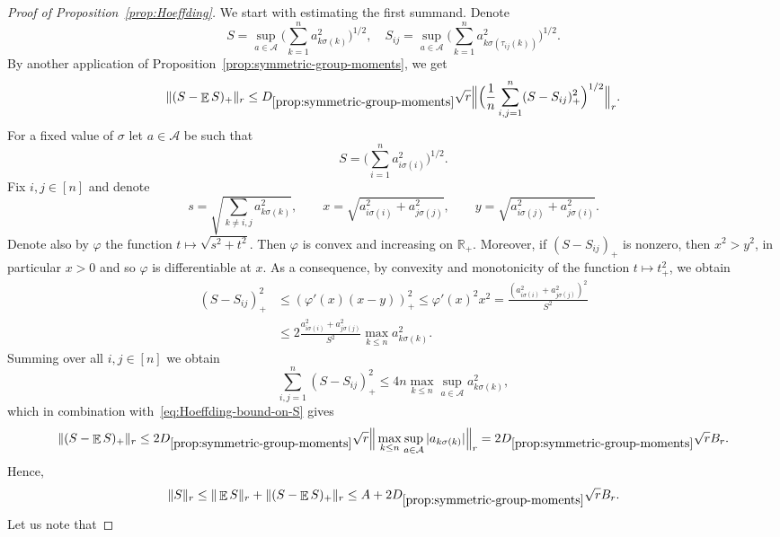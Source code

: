 \documentclass[a4paper]{amsart}
\theoremstyle{definition}
\theoremstyle{remark}
\numberwithin{equation}{section}
\newcommand*{\RR}{\mathbb{R}}
\newcommand*{\ds}{D_{\ref{prop:symmetric-group-moments}}}
\DeclareMathOperator{\EE}{\mathbb{E}} %
\begin{document}
\begin{proof}[Proof of Proposition~\ref{prop:Hoeffding}]
We start with estimating the first summand.
Denote
\[S = \sup_{a\in \mathcal{A}}\Big(\sum_{k=1}^n a_{k\sigma(k)}^2\Big)^{1/2},
\quad
S_{ij} = \sup_{a\in \mathcal{A}}\Big(\sum_{k=1}^n a_{k\sigma(\tau_{ij}(k))}^2\Big)^{1/2}.
\]
 By another application  of Proposition~\ref{prop:symmetric-group-moments}, we get
\begin{align}\label{eq:Hoeffding-bound-on-S}
  \|(S-\EE S)_+\|_r \le \ds\sqrt{r} \Big\|\Big(\frac{1}{n}\sum_{i,j=1}^n (S-S_{ij})_+^2\Big)^{1/2}\Big\|_r.
\end{align}
For a fixed value of $\sigma$ let $a \in \mathcal{A}$ be such that
\begin{displaymath}
  S = \Big(\sum_{i=1}^n a_{i\sigma(i)}^2\Big)^{1/2}.
\end{displaymath}
Fix $i,j \in [n]$ and denote
\begin{displaymath}
s = \sqrt{\sum_{k\neq i,j} a_{k\sigma(k)}^2},
\qquad
x = \sqrt{a_{i\sigma(i)}^2+a_{j\sigma(j)}^2},
\qquad
y = \sqrt{a_{i\sigma(j)}^2+a_{j\sigma(i)}^2}.
\end{displaymath}
 Denote also by $\varphi$ the function $t \mapsto \sqrt{s^2 + t^2}$. Then $\varphi$ is convex and increasing on $\RR_+$. Moreover, if $(S - S_{ij})_+$ is nonzero, then $x^2 > y^2$, in particular $x > 0$ and so $\varphi$ is differentiable at $x$. As a consequence, by convexity and monotonicity of the function $t \mapsto t_+^2$, we obtain
\begin{align*}
  (S-S_{ij})_+^2 & \le (\varphi'(x)(x-y))_+^2 \le \varphi'(x)^2 x^2 = \frac{(a_{i\sigma(i)}^2 + a_{j\sigma(j)}^2)^2}{ S^2} \\
  & \le 2\frac{a_{i\sigma(i)}^2 + a_{j\sigma(j)}^2}{ S^2} \max_{k\le n} a_{k\sigma(k)}^2.
\end{align*}
Summing over all $i,j \in [n]$ we obtain
\begin{displaymath}
  \sum_{i,j=1}^n (S - S_{ij})_+^2 \le 4n\max_{k\le n} \sup_{a \in \mathcal{A}} a_{k\sigma(k)}^2,
\end{displaymath}
which in combination with~\eqref{eq:Hoeffding-bound-on-S} gives
\begin{align}\label{eq:Hoeffding-bound-on-S-1}
  \|(S- \EE S)_+\|_r \le 2\ds\sqrt{r}\Big\|\max_{k\le n}\sup_{a\in\mathcal{A}}|a_{k\sigma(k)}|\Big\|_r = 2\ds\sqrt{r}B_r.
\end{align}
Hence,
\begin{equation}
\label{eq:Hoeff-proof-added-15}
\|S\|_r \leq \|\EE S\|_r  + \|(S- \EE S)_+\|_r \leq A+ 2\ds\sqrt{r}B_r.
\end{equation}
Let us note that

\end{proof}
\end{document}
